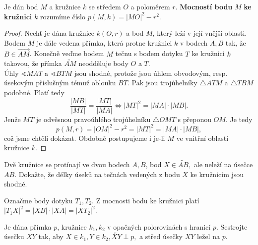 \begin{definition}
  Je dán bod $M$ a kružnice $k$ se středem $O$ a poloměrem $r$. \textbf{Mocností bodu} $M$ \textbf{ke kružnici} $k$ rozumíme číslo $p(M, k) = |MO|^2-r^2.$
\end{definition}


\begin{proof}
Nechť je dána kružnice $k(O,r)$ a bod $M$, který leží v její vnější oblasti. Bodem $M$ je dále
vedena přímka, která protne kružnici $k$ v bodech $A,B$ tak, že $B\in \overrightarrow{AM}$.
Konečně veďme bodem $M$ tečnu s bodem dotyku $T$ ke kružnici $k$ takovou, že přímka
$\overleftrightarrow{AM}$ neodděluje body $O$ a $T$.\\
Úhly $\sphericalangle MAT$ a $\sphericalangle BTM$ jsou shodné, protože jsou úhlem obvodovým, resp.
úsekovým příslušným témuž oblouku $BT$. Pak jsou trojúhelníky $\triangle ATM$ a $\triangle TBM$ podobné.
Platí tedy
$$\frac{|MB|}{|MT|}=\frac{|MT|}{|MA|} \iff |MT|^2=|MA|\cdot |MB|.$$
Jenže $MT$ je odvěsnou pravoúhlého trojúhelníku $\triangle OMT$ s přeponou $OM$. Je tedy
$$p(M,r)=|OM|^2-r^2=|MT|^2=|MA|\cdot |MB|,$$
což jsme chtěli dokázat.
Obdobně postupujeme i je-li $M$ ve vnitřní oblasti kružnice $k$.
\end{proof}


\begin{priklad}
Dvě kružnice se protínají ve dvou bodech $A,B$, bod $X \in \overleftrightarrow{AB},$
ale neleží na úsečce $AB$. Dokažte, že délky úseků na tečnách vedených z bodu $X$
ke kružnicím jsou shodné.
\end{priklad}

\begin{reseni}
Označme body dotyku $T_1,T_2.$ Z mocnosti bodu ke kružnici platí
$|T_1X|^2=|XB|\cdot |XA|=|XT_2|^2.$
\end{reseni}

\begin{priklad}
Je dána přímka $p$, kružnice $k_1, k_2$ v opačných polorovinách s hranicí $p.$
Sestrojte úsečku $XY$ tak, aby $X\in k_1, Y\in k_2, \overleftrightarrow{XY} \perp p,$ a
střed úsečky $XY$ ležel na $p.$
\end{priklad}

